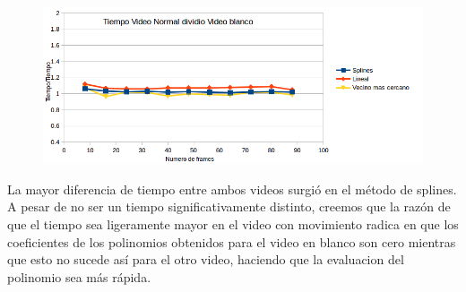 \begin{figure}
  \vspace{-20pt}
  \begin{center}
    \includegraphics[scale= 0.6]{imagenes/aumentandoFramesMessiSobreWhite.png}
  \end{center}
  \vspace{-10pt}
  \vspace{-10pt}
\end{figure}

La mayor diferencia de tiempo entre ambos videos surgió en el método de splines. A pesar de no ser un tiempo significativamente distinto, creemos que la razón de que el tiempo sea ligeramente mayor en el video con movimiento radica en que los coeficientes de los polinomios obtenidos para el video en blanco son cero mientras que esto no sucede así para el otro video, haciendo que la evaluacion del polinomio sea más rápida.









